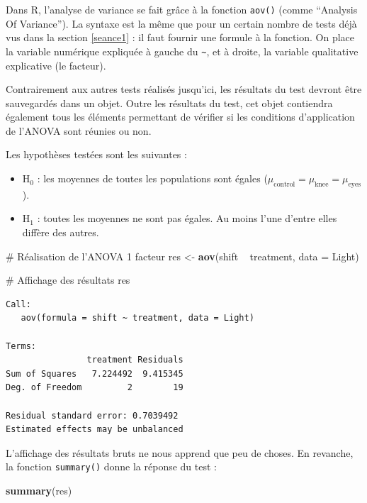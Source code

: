 \documentclass[a4paperpaper,]{article}
\newenvironment{Shaded}{\begin{snugshade}}{\end{snugshade}}
\newcommand{\CommentTok}[1]{\textcolor[rgb]{0.54,0.53,0.53}{#1}}
\newcommand{\DataTypeTok}[1]{\textcolor[rgb]{0.00,0.34,0.68}{#1}}
\newcommand{\KeywordTok}[1]{\textcolor[rgb]{0.12,0.11,0.11}{\textbf{#1}}}
\newcommand{\NormalTok}[1]{\textcolor[rgb]{0.12,0.11,0.11}{#1}}
\newcommand{\OperatorTok}[1]{\textcolor[rgb]{0.12,0.11,0.11}{#1}}
\newcommand{\StringTok}[1]{\textcolor[rgb]{0.75,0.01,0.01}{#1}}
\providecommand{\tightlist}{%
  \setlength{\itemsep}{0pt}\setlength{\parskip}{0pt}}
\begin{document}
Dans R, l'analyse de variance se fait grâce à la fonction \texttt{aov()} (comme ``Analysis Of Variance''). La syntaxe est la même que pour un certain nombre de tests déjà vus dans la section \ref{seance1} : il faut fournir une formule à la fonction. On place la variable numérique expliquée à gauche du \texttt{\textasciitilde{}}, et à droite, la variable qualitative explicative (le facteur).

Contrairement aux autres tests réalisés jusqu'ici, les résultats du test devront être sauvegardés dans un objet. Outre les résultats du test, cet objet contiendra également tous les éléments permettant de vérifier si les conditions d'application de l'ANOVA sont réunies ou non.

Les hypothèses testées sont les suivantes :

\begin{itemize}
\tightlist
\item
  H\(_0\) : les moyennes de toutes les populations sont égales (\(\mu_{\textrm{control}} = \mu_{\textrm{knee}} = \mu_{\textrm{eyes}}\)).
\item
  H\(_1\) : toutes les moyennes ne sont pas égales. Au moins l'une d'entre elles diffère des autres.
\end{itemize}

\begin{Shaded}
\begin{Highlighting}[]
\CommentTok{# Réalisation de l'ANOVA 1 facteur}
\NormalTok{res <-}\StringTok{ }\KeywordTok{aov}\NormalTok{(shift }\OperatorTok{~}\StringTok{ }\NormalTok{treatment, }\DataTypeTok{data =}\NormalTok{ Light)}

\CommentTok{# Affichage des résultats}
\NormalTok{res}
\end{Highlighting}
\end{Shaded}

\begin{verbatim}
Call:
   aov(formula = shift ~ treatment, data = Light)

Terms:
                treatment Residuals
Sum of Squares   7.224492  9.415345
Deg. of Freedom         2        19

Residual standard error: 0.7039492
Estimated effects may be unbalanced
\end{verbatim}

L'affichage des résultats bruts ne nous apprend que peu de choses. En revanche, la fonction \texttt{summary()} donne la réponse du test :

\begin{Shaded}
\begin{Highlighting}[]
\KeywordTok{summary}\NormalTok{(res)}
\end{Highlighting}
\end{Shaded}
\end{document}
